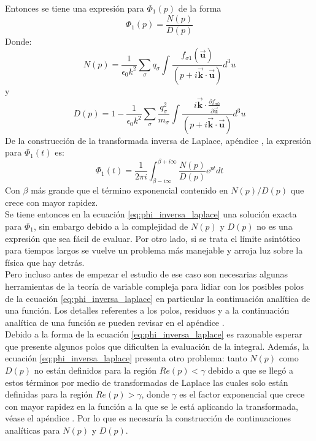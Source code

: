 \documentclass[../tesis_main_file.tex]{subfiles}
\begin{document}
Entonces se tiene una expresión para $\Phi_1(p)$ de la forma
\begin{equation}
\label{eq:phi_num_y_denominador}
\Phi_1(p)=\frac{N(p)}{D(p)}
\end{equation}
Donde:
\begin{equation}
\label{eq:funcion_numerador}
N(p)=\frac{1}{\epsilon_0 k^2}\sum_{\sigma}q_{\sigma}\int \frac{f_{\sigma 1}(\overrightarrow{\textbf{u}})}{(p + i\overrightarrow{\textbf{k}}\cdot \overrightarrow{\textbf{u}})}d^3u
\end{equation}
y
\begin{equation}
\label{eq:funcion_denominador}
D(p)=1-\frac{1}{\epsilon_0 k^2}\sum_{\sigma}\frac{q_{\sigma}^2}{m_{\sigma}}\int  \frac{i\overrightarrow{\textbf{k}}\cdot \frac{\partial f_{\sigma 0}}{\partial \overrightarrow{\textbf{u}}}}{(p + i\overrightarrow{\textbf{k}}\cdot \overrightarrow{\textbf{u}})}d^3u
\end{equation}
De la construcción de la transformada inversa de Laplace, apéndice \notinsubfile{\ref{Ap:Laplace}}, la expresión para $\Phi _1(t)$ es:
\begin{equation}
\label{eq:phi_inversa_laplace}
\Phi_1(t) =\frac{1}{2\pi i}\int ^{\beta +i \infty}_{\beta - i\infty} \frac{N(p)}{D(p)}e^{pt}dt
\end{equation}
Con $\beta$ más grande que el término exponencial contenido en $N(p)/D(p)$ que crece con mayor rapidez.\\
Se tiene entonces en la ecuación \ref{eq:phi_inversa_laplace} una solución exacta para $\Phi_1$, sin embargo debido a la complejidad de $N(p)$ y $D(p)$ no es una expresión que sea fácil de evaluar. Por otro lado, si se trata el límite asintótico para tiempos largos se vuelve un problema más manejable y arroja luz sobre la física que hay detrás.\\
Pero incluso antes de empezar el estudio de ese caso son necesarias algunas herramientas de la teoría de variable compleja para lidiar con los posibles polos de la ecuación \ref{eq:phi_inversa_laplace} en particular la continuación analítica de una función. Los detalles referentes a los polos, residuos y a la continuación analítica de una función se pueden revisar en el apéndice \notinsubfile{\ref{Ap:temas_Var_compleja}}.\\
Debido a la forma de la ecuación \ref{eq:phi_inversa_laplace} es razonable esperar que presente algunos polos que dificulten la evaluación de la integral. Además, la ecuación \ref{eq:phi_inversa_laplace} presenta otro problema: tanto $N(p)$ como $D(p)$ no están definidos para la región $Re(p) < \gamma$ debido a que se llegó a estos términos por medio de transformadas de Laplace las cuales solo están definidas para la región $Re(p) > \gamma$, donde $\gamma$ es el factor exponencial que crece con mayor rapidez en la función a la que se le está aplicando la transformada, véase el apéndice \notinsubfile{\ref{Ap:Laplace}}. Por lo que es necesaría la construcción de continuaciones analíticas para $N(p)$ y $D(p)$.\\
\end{document}
